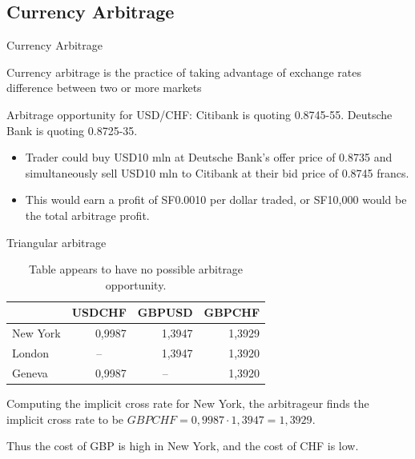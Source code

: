 \documentclass[international_finance_p1.tex]{subfiles}
\begin{document}
\subsection{Currency Arbitrage}
\begin{frame}{Currency Arbitrage}
\begin{block}{Currency arbitrage}
 is the practice of taking advantage of exchange rates difference between two or more markets
\end{block}
Arbitrage opportunity for USD/CHF:
Citibank is quoting 0.8745-55.
Deutsche Bank is quoting 0.8725-35.
\begin{itemize}[<+->]
\item
Trader could buy USD10 mln at Deutsche Bank’s offer price of 0.8735 and simultaneously sell USD10 mln to Citibank at their bid price of 0.8745 francs. 
\item
This would earn a profit of SF0.0010 per dollar traded, or SF10,000 would be the total arbitrage profit.
\end{itemize}
\end{frame}
\begin{frame}{Triangular arbitrage}
\begin{table}[htbp]
  \centering
\begin{tabularx}{\linewidth}[b]{@{}>{\raggedright\arraybackslash}Xrrr@{}}    \toprule
          & USDCHF & GBPUSD & GBPCHF \\
    \midrule
    New York & 0,9987 & 1,3947 &  {1,3929} \\
    London & \multicolumn{1}{c}{--} & 1,3947 & 1,3920 \\
    Geneva & 0,9987 & \multicolumn{1}{c}{--} & 1,3920 \\
    \bottomrule
    \end{tabularx}%
  \label{tab:addlabel}%
  \caption*{Table appears to have no possible arbitrage opportunity.}
\end{table}%
 Computing the implicit cross rate for New York, the arbitrageur finds the implicit cross rate to be $GBPCHF = 0,9987 \cdot 1,3947 = 1,3929.$

Thus the cost of GBP is high in New York, and the cost of CHF is low.
\end{frame}
\end{document}
